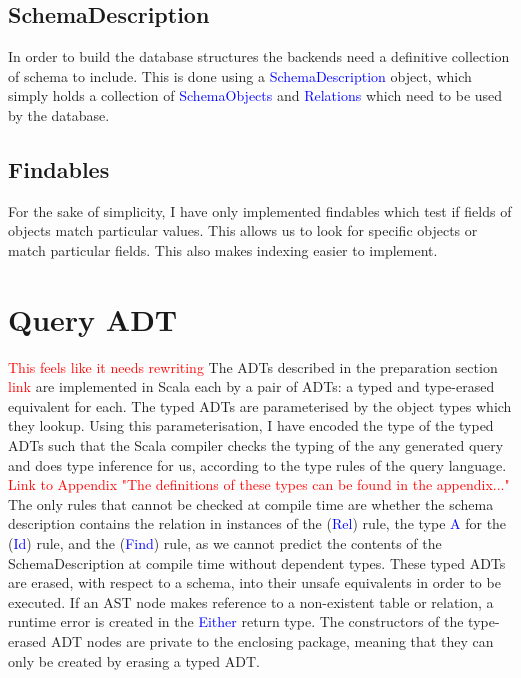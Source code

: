 \documentclass[12pt,a4paper,twoside,openright]{report}
\newcommand\todo[1]{\textcolor{red}{#1}}
\newcommand\codeName[1]{\textcolor{blue}{#1}}
\begin{document}
{{	
	\subsection{SchemaDescription}
	
In order to build the database structures the backends need a definitive collection of schema to include. This is done using a \codeName{SchemaDescription} object, which simply holds a collection of \codeName{SchemaObjects} and \codeName{Relations} which need to be used by the database.	
	
	\subsection{Findables}
	For the sake of simplicity, I have only implemented findables which test if fields of objects match particular values. This allows us to look for specific objects or match particular fields. This also makes indexing easier to implement.
	
\section{Query ADT}
	\todo{This feels like it needs rewriting}
The ADTs described in the preparation section \todo{link}	are implemented in Scala each by a pair of ADTs: a typed and type-erased equivalent for each. The typed ADTs are parameterised by the object types which they lookup. Using this parameterisation, I have encoded the type of the typed ADTs such that the Scala compiler checks the typing of the any generated query and does type inference for us, according to the type rules of the query language. \todo{Link to Appendix "The definitions of these types can be found in the appendix..."} The only rules that cannot be checked at compile time are whether the schema description contains the relation in instances of the (\codeName{Rel}) rule, the type \codeName{A} for the (\codeName{Id}) rule, and the (\codeName{Find}) rule, as we cannot predict the contents of the SchemaDescription at compile time without dependent types.  These typed ADTs are erased,  with respect to a schema,  into their unsafe equivalents in order to be executed. If an AST node makes reference to a non-existent table or relation, a runtime error is created in the \codeName{Either} return type. The constructors of the type-erased ADT nodes are private to the enclosing package, meaning that they can only be created by erasing a typed ADT.
	
}}
\end{document}
